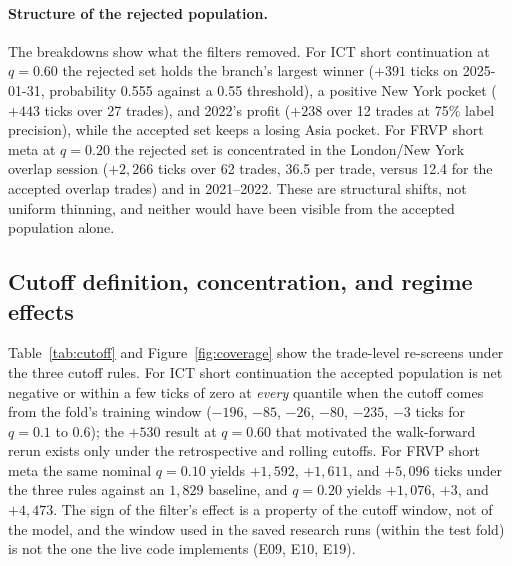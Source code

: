 \documentclass[10pt]{article}
\begin{document}
\paragraph{Structure of the rejected population.} The breakdowns show what the filters removed. For ICT short continuation at $q=0.60$ the rejected set holds the branch's largest winner ($+391$ ticks on 2025-01-31, probability 0.555 against a 0.55 threshold), a positive New York pocket ($+443$ ticks over 27 trades), and 2022's profit ($+238$ over 12 trades at 75\% label precision), while the accepted set keeps a losing Asia pocket. For FRVP short meta at $q=0.20$ the rejected set is concentrated in the London/New York overlap session ($+2{,}266$ ticks over 62 trades, 36.5 per trade, versus 12.4 for the accepted overlap trades) and in 2021--2022. These are structural shifts, not uniform thinning, and neither would have been visible from the accepted population alone.

\subsection{Cutoff definition, concentration, and regime effects}

Table~\ref{tab:cutoff} and Figure~\ref{fig:coverage} show the trade-level re-screens under the three cutoff rules. For ICT short continuation the accepted population is net negative or within a few ticks of zero at \emph{every} quantile when the cutoff comes from the fold's training window ($-196$, $-85$, $-26$, $-80$, $-235$, $-3$ ticks for $q=0.1$ to $0.6$); the $+530$ result at $q=0.60$ that motivated the walk-forward rerun exists only under the retrospective and rolling cutoffs. For FRVP short meta the same nominal $q=0.10$ yields $+1{,}592$, $+1{,}611$, and $+5{,}096$ ticks under the three rules against an $1{,}829$ baseline, and $q=0.20$ yields $+1{,}076$, $+3$, and $+4{,}473$. The sign of the filter's effect is a property of the cutoff window, not of the model, and the window used in the saved research runs (within the test fold) is not the one the live code implements (E09, E10, E19).

\begin{table}[t]
\centering\small
\caption{Accepted-population net PnL for the same nominal quantile under three cutoff rules (ES ticks). Retrospective: quantile of the test fold's own emitted probabilities (the 2026-08-30 screen). Causal: quantile of the fold's saved training-window trades. Rolling: quantile of the previous 100 emitted test trades.}
\label{tab:cutoff}
\resizebox{\textwidth}{!}{}
\end{table}
\end{document}
